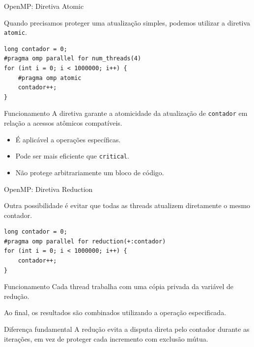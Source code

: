 \documentclass[aspectratio=169,11pt]{beamer}
\begin{document}
\begin{frame}[fragile]{OpenMP: Diretiva Atomic}

Quando precisamos proteger uma atualização simples,
podemos utilizar a diretiva \texttt{atomic}.

\small
\begin{verbatim}
long contador = 0;
#pragma omp parallel for num_threads(4)
for (int i = 0; i < 1000000; i++) {
    #pragma omp atomic
    contador++;
}
\end{verbatim}

\vspace{0.3cm}

\begin{block}{Funcionamento}
A diretiva garante a atomicidade da atualização
de \texttt{contador} em relação a acessos
atômicos compatíveis.
\end{block}

\begin{itemize}
    \item É aplicável a operações específicas.
    \item Pode ser mais eficiente que \texttt{critical}.
    \item Não protege arbitrariamente um bloco de código.
\end{itemize}

\end{frame}



\begin{frame}[fragile]{OpenMP: Diretiva Reduction}

Outra possibilidade é evitar que todas as threads
atualizem diretamente o mesmo contador.

\small
\begin{verbatim}
long contador = 0;
#pragma omp parallel for reduction(+:contador)
for (int i = 0; i < 1000000; i++) {
    contador++;
}
\end{verbatim}

\vspace{0.3cm}

\begin{block}{Funcionamento}
Cada thread trabalha com uma cópia privada
da variável de redução.

Ao final, os resultados são combinados
utilizando a operação especificada.
\end{block}

\begin{alertblock}{Diferença fundamental}
A redução evita a disputa direta pelo contador
durante as iterações, em vez de proteger
cada incremento com exclusão mútua.
\end{alertblock}

\end{frame}
\end{document}
